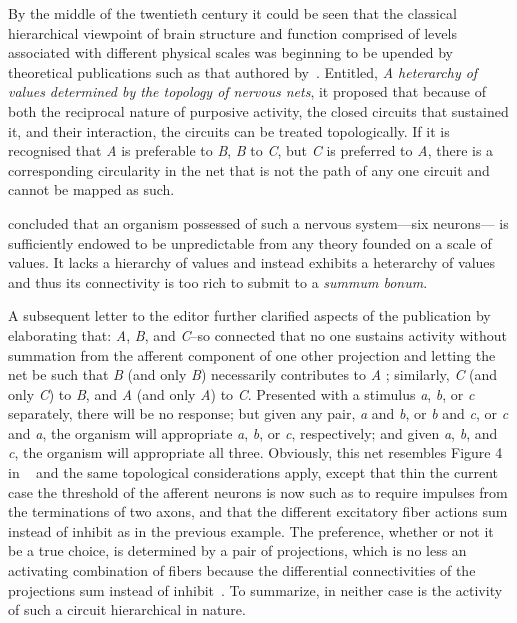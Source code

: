 \documentclass[11pt,3p,twocolumn]{JMN}
\begin{document}
By the middle of the twentieth century it could be seen that the classical hierarchical viewpoint of brain structure and function comprised of levels associated with different physical scales was beginning to be upended by theoretical publications such as that authored by~\citet{mcculloch45a}. Entitled, {\it{A heterarchy of values determined by the topology of nervous nets}}, it proposed that because of both the reciprocal nature of purposive activity, the closed circuits that sustained it, and their interaction, the circuits can be treated topologically. If it is recognised that {\it{A}} is preferable to {\it{B}}, {\it{B}} to {\it{C}}, but {\it{C}} is preferred to {\it{A}}, there is a  corresponding circularity in the net that is not the path of any one circuit and cannot be mapped as such.

\citeauthor{mcculloch45a} concluded that an organism possessed of such a nervous system---six neurons--- is sufficiently endowed to be unpredictable from any theory founded on a scale of values. It lacks a hierarchy of values and instead exhibits a heterarchy of values and thus its connectivity is too rich to submit to a {\it{summum bonum}}.

A subsequent letter to the editor further clarified aspects of the publication by elaborating that: {\it{A}}, {\it{B}}, and {\it{C}}--so connected that no one sustains activity without summation from the afferent component of one other projection and letting the net be such that {\it{B}} (and only {\it{B}}) necessarily contributes to {\it{A}} ; similarly, {\it{C}} (and only {\it{C}}) to {\it{B}}, and {\it{A}} (and only {\it{A}}) to {\it{C}}. Presented with a stimulus {\it{a}}, {\it{b}}, or {\it{c}} separately, there will be no response; but given any pair, {\it{a}} and {\it{b}}, or {\it{b}} and {\it{c}}, or {\it{c}} and {\it{a}}, the organism will appropriate {\it{a}}, {\it{b}}, or {\it{c}}, respectively; and given {\it{a}}, {\it{b}}, and {\it{c}}, the organism will appropriate all three. Obviously, this net resembles Figure 4 in ~\citet{mcculloch45a} and the same topological considerations apply, except that thin the current case the threshold of the afferent neurons is now such as to require impulses from the terminations of two axons, and that the different excitatory fiber actions sum instead of inhibit as in the previous example. The preference, whether or not it be a true choice, is determined by a pair of projections, which is no less an activating combination of fibers because the differential connectivities of the projections sum instead of inhibit~\citep{mcculloch45b}. To summarize, in neither case is the activity of such a circuit hierarchical in nature.
\end{document}
